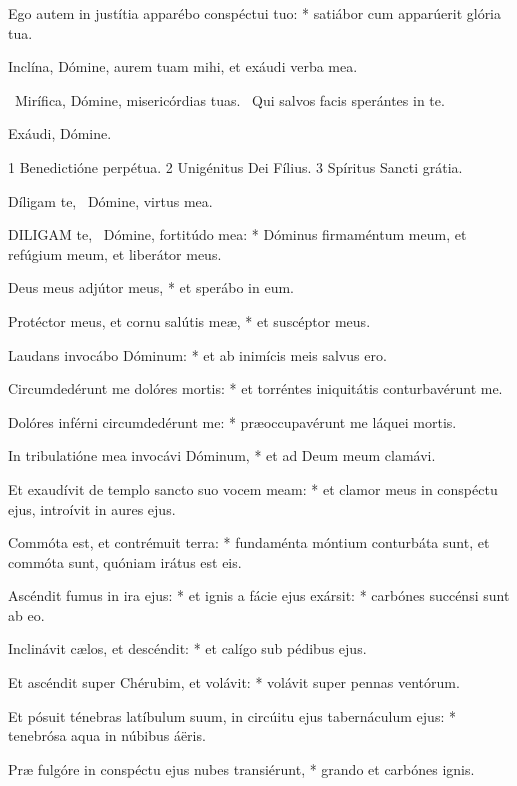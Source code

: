 Ego autem in justítia apparébo conspéctui tuo: * satiábor cum apparúerit glória tua.

 Inclína, Dómine, aurem tuam mihi, et exáudi verba mea.


\V\ Mirífica, Dómine, misericórdias tuas. \R\ Qui salvos facis sperántes in te.

 Exáudi, Dómine.

 1 Benedictióne perpétua. 2 Unigénitus Dei Fílius. 3 Spíritus Sancti grátia.


 Díligam te, \textdagger\ Dómine, virtus mea.


\lettrine[lines=2]{D}{ILIGAM} te, \textdagger\ Dómine, fortitúdo mea: * Dóminus firmaméntum meum, et refúgium meum, et liberátor meus.

Deus meus adjútor meus, * et sperábo in eum.

Protéctor meus, et cornu salútis meæ, * et suscéptor meus.

Laudans invocábo Dóminum: * et ab inimícis meis salvus ero.

Circumdedérunt me dolóres mortis: * et torréntes iniquitátis conturbavérunt me.

Dolóres inférni circumdedérunt me: * præoccupavérunt me láquei mortis.

In tribulatióne mea invocávi Dóminum, * et ad Deum meum clamávi.

Et exaudívit de templo sancto suo vocem meam: * et clamor meus in conspéctu ejus, introívit in aures ejus.

Commóta est, et contrémuit terra: * fundaménta móntium conturbáta sunt, et commóta sunt, quóniam irátus est eis.

Ascéndit fumus in ira ejus: * et ignis a fácie ejus exársit: * carbónes succénsi sunt ab eo.

Inclinávit cælos, et descéndit: * et calígo sub pédibus ejus.

Et ascéndit super Chérubim, et volávit: * volávit super pennas ventórum.

Et pósuit ténebras latíbulum suum, in circúitu ejus tabernáculum ejus: * tenebrósa aqua in núbibus áëris.

Præ fulgóre in conspéctu ejus nubes transiérunt, * grando et carbónes ignis.

